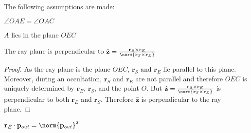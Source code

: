 \documentclass[crop=false,class=article,oneside]{standalone}
\begin{document}
        \vspace{6pt}
        The following assumptions are made:
        \begin{enumerate}
            \begin{multicols}{2}
                \item $\angle{OAE}=\angle{OAC}$
                \item $A$ lies in the plane $OEC$
            \end{multicols}
        \end{enumerate}
        \begin{theorem}
            \label{theorem:ray_plane_perp_to_r_e_cross_r_s}
            The ray plane is perpendicular to
            $\hat{\mathbf{z}}%
             =\frac{\mathbf{r}_{S}\times
             \mathbf{r}_{E}}{\norm{\mathbf{r}_{S}\times
             \mathbf{r}_{E}}}$
        \end{theorem}
        \begin{proof}
            As the ray plane is the plane $OEC$,
            $\mathbf{r}_{S}$ and $\mathbf{r}_{E}$ lie parallel
            to this plane. Moreover, during an occultation,
            $\mathbf{r}_{S}$ and $\mathbf{r}_{E}$ are not
            parallel and therefore $OEC$ is uniquely determined
            by $\mathbf{r}_{E}$, $\mathbf{r}_{S}$, and the point
            $O$. But
            $\hat{\mathbf{z}}%
             =\frac{\mathbf{r}_{S}\times
             \mathbf{r}_{E}}{\norm{\mathbf{r}_{S}\times
             \mathbf{r}_{E}}}$
            is perpendicular to both $\mathbf{r}_{E}$ and
            $\mathbf{r}_{S}$. Therefore $\hat{\mathbf{z}}$ is
            perpendicular to the ray plane.
        \end{proof}
        \begin{theorem}
            \label{theorem:r_e_dot_p_out_equal_p_out_square}
            $\mathbf{r}_{E}\cdot\mathbf{p}_{out}%
             =\norm{\mathbf{p}_{out}}^{2}$
        \end{theorem}
\end{document}
